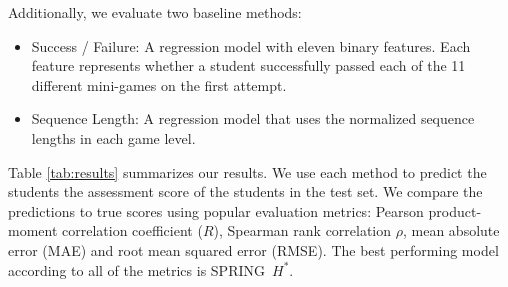 \documentclass{sigchi}
\def\algname{SPRING\xspace}
\begin{document}
	Additionally, we evaluate two baseline methods:
	\begin{itemize}
		\item Success / Failure: A regression model with eleven binary features. Each feature represents whether a student  successfully passed each of the 11 different mini-games on the first attempt.
		\item Sequence Length: A regression model that uses the normalized sequence lengths in each game level. 
	\end{itemize}
	
	
	Table \ref{tab:results} summarizes our results.
	We use each method to predict the students the assessment score of the students in the test set.
	We compare the predictions to true scores using popular evaluation metrics:
	Pearson product-moment correlation coefficient ($R$), Spearman rank correlation $\rho$, mean absolute error (MAE) and root mean squared error (RMSE). 
	The best performing model according to all of the metrics is \algname~$H^*$.
	
\end{document}
